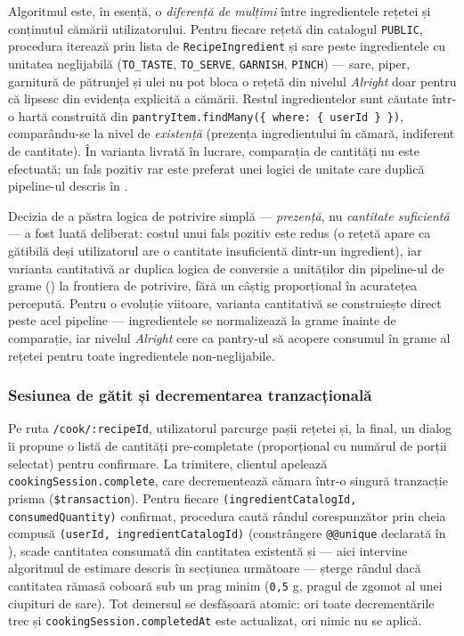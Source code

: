 Algoritmul este, în esență, o \textit{diferență de mulțimi} între ingredientele rețetei și conținutul cămării utilizatorului. Pentru fiecare rețetă din catalogul \texttt{PUBLIC}, procedura iterează prin lista de \texttt{RecipeIngredient} și sare peste ingredientele cu unitatea neglijabilă (\texttt{TO\_TASTE}, \texttt{TO\_SERVE}, \texttt{GARNISH}, \texttt{PINCH}) --- sare, piper, garnitură de pătrunjel și ulei nu pot bloca o rețetă din nivelul \textit{Alright} doar pentru că lipsesc din evidența explicită a cămării. Restul ingredientelor sunt căutate într-o hartă construită din \texttt{pantryItem.findMany(\{ where: \{ userId \} \})}, comparându-se la nivel de \textit{existență} (prezența ingredientului în cămară, indiferent de cantitate). În varianta livrată în lucrare, comparația de cantități nu este efectuată; un fals pozitiv rar este preferat unei logici de unitate care duplică pipeline-ul descris în .

Decizia de a păstra logica de potrivire simplă --- \textit{prezență}, nu \textit{cantitate suficientă} --- a fost luată deliberat: costul unui fals pozitiv este redus (o rețetă apare ca gătibilă deși utilizatorul are o cantitate insuficientă dintr-un ingredient), iar varianta cantitativă ar duplica logica de conversie a unităților din pipeline-ul de grame () la frontiera de potrivire, fără un câștig proporțional în acuratețea percepută. Pentru o evoluție viitoare, varianta cantitativă se construiește direct peste acel pipeline --- ingredientele se normalizează la grame înainte de comparație, iar nivelul \textit{Alright} cere ca pantry-ul să acopere consumul în grame al rețetei pentru toate ingredientele non-neglijabile.

\subsubsection{Sesiunea de gătit și decrementarea tranzacțională}\label{subsec:sesiune-gatit}

Pe ruta \texttt{/cook/:recipeId}, utilizatorul parcurge pașii rețetei și, la final, un dialog îi propune o listă de cantități pre-completate (proporțional cu numărul de porții selectat) pentru confirmare. La trimitere, clientul apelează \texttt{cookingSession.complete}, care decrementează cămara într-o singură tranzacție \gls{prisma} (\texttt{\$transaction}). Pentru fiecare \texttt{(ingredientCatalogId, consumedQuantity)} confirmat, procedura caută rândul corespunzător prin cheia compusă \texttt{(userId, ingredientCatalogId)} (constrângere \texttt{@@unique} declarată în ), scade cantitatea consumată din cantitatea existentă și --- aici intervine algoritmul de estimare descris în secțiunea următoare --- șterge rândul dacă cantitatea rămasă coboară sub un prag minim (\texttt{0,5} g, pragul de zgomot al unei ciupituri de sare). Tot demersul se desfășoară atomic: ori toate decrementările trec și \texttt{cookingSession.completedAt} este actualizat, ori nimic nu se aplică.


